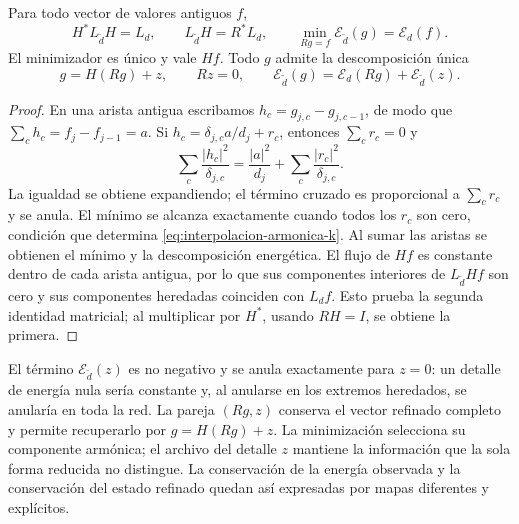 \begin{theorem}
\label{thm:energia-schur-refinamiento}
Para todo vector de valores antiguos \(f\),
\begin{equation}
 H^*L_{\widetilde d}H=L_d,
 \qquad L_{\widetilde d}H=R^*L_d,
 \qquad
 \min_{Rg=f}\mathcal E_{\widetilde d}(g)=\mathcal E_d(f).
 \label{eq:isometria-energia-k}
\end{equation}
El minimizador es único y vale \(Hf\). Todo \(g\) admite la
descomposición única
\begin{equation}
 g=H(Rg)+z,\qquad Rz=0,
 \qquad
 \mathcal E_{\widetilde d}(g)
 =\mathcal E_d(Rg)+\mathcal E_{\widetilde d}(z).
 \label{eq:detalle-energia-k}
\end{equation}
\end{theorem}
\begin{proof}
En una arista antigua escribamos \(h_c=g_{j,c}-g_{j,c-1}\), de modo
que \(\sum_ch_c=f_j-f_{j-1}=a\). Si
\(h_c=\delta_{j,c}a/d_j+r_c\), entonces \(\sum_cr_c=0\) y
\[
 \sum_c\frac{|h_c|^2}{\delta_{j,c}}
 =\frac{|a|^2}{d_j}+\sum_c\frac{|r_c|^2}{\delta_{j,c}}.
\]
La igualdad se obtiene expandiendo; el término cruzado es proporcional a
\(\sum_cr_c\) y se anula. El mínimo se alcanza exactamente cuando
todos los \(r_c\) son cero, condición que determina
\eqref{eq:interpolacion-armonica-k}. Al sumar las aristas se obtienen
el mínimo y la descomposición energética. El flujo de \(Hf\) es
constante dentro de cada arista antigua, por lo que sus componentes
interiores de \(L_{\widetilde d}Hf\) son cero y sus componentes heredadas
coinciden con \(L_df\). Esto prueba la segunda identidad matricial; al
multiplicar por \(H^*\), usando \(RH=I\), se obtiene la primera.
\end{proof}

El término \(\mathcal E_{\widetilde d}(z)\) es no negativo y se anula
exactamente para \(z=0\): un detalle de energía nula sería constante y,
al anularse en los extremos heredados, se anularía en toda la red.
La pareja \((Rg,z)\) conserva el vector refinado completo y permite
recuperarlo por \(g=H(Rg)+z\). La minimización selecciona su
componente armónica; el archivo del detalle \(z\) mantiene la
información que la sola forma reducida no distingue. La conservación
de la energía observada y la conservación del estado refinado quedan
así expresadas por mapas diferentes y explícitos.

